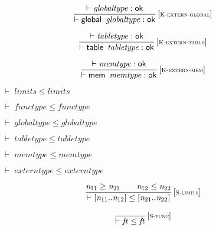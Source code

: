 $$
\begin{array}{@{}c@{}}\displaystyle
\frac{
{ \vdash }\;{\mathit{globaltype}} : \mathsf{ok}
}{
{ \vdash }\;\mathsf{global}~\,{\mathit{globaltype}} : \mathsf{ok}
} \, {[\textsc{\scriptsize K{-}extern{-}global}]}
\qquad
\end{array}
$$

$$
\begin{array}{@{}c@{}}\displaystyle
\frac{
{ \vdash }\;{\mathit{tabletype}} : \mathsf{ok}
}{
{ \vdash }\;\mathsf{table}~\,{\mathit{tabletype}} : \mathsf{ok}
} \, {[\textsc{\scriptsize K{-}extern{-}table}]}
\qquad
\end{array}
$$

$$
\begin{array}{@{}c@{}}\displaystyle
\frac{
{ \vdash }\;{\mathit{memtype}} : \mathsf{ok}
}{
{ \vdash }\;\mathsf{mem}~\,{\mathit{memtype}} : \mathsf{ok}
} \, {[\textsc{\scriptsize K{-}extern{-}mem}]}
\qquad
\end{array}
$$

\vspace{1ex}

\vspace{1ex}

$\boxed{{ \vdash }\;{\mathit{limits}} \leq {\mathit{limits}}}$

$\boxed{{ \vdash }\;{\mathit{functype}} \leq {\mathit{functype}}}$

$\boxed{{ \vdash }\;{\mathit{globaltype}} \leq {\mathit{globaltype}}}$

$\boxed{{ \vdash }\;{\mathit{tabletype}} \leq {\mathit{tabletype}}}$

$\boxed{{ \vdash }\;{\mathit{memtype}} \leq {\mathit{memtype}}}$

$\boxed{{ \vdash }\;{\mathit{externtype}} \leq {\mathit{externtype}}}$

\vspace{1ex}

$$
\begin{array}{@{}c@{}}\displaystyle
\frac{
{\mathit{n}}_{{11}} \geq {\mathit{n}}_{{21}}
 \qquad
{\mathit{n}}_{{12}} \leq {\mathit{n}}_{{22}}
}{
{ \vdash }\;{}[{\mathit{n}}_{{11}} .. {\mathit{n}}_{{12}}] \leq {}[{\mathit{n}}_{{21}} .. {\mathit{n}}_{{22}}]
} \, {[\textsc{\scriptsize S{-}limits}]}
\qquad
\end{array}
$$

$$
\begin{array}{@{}c@{}}\displaystyle
\frac{
}{
{ \vdash }\;{\mathit{ft}} \leq {\mathit{ft}}
} \, {[\textsc{\scriptsize S{-}func}]}
\qquad
\end{array}
$$

